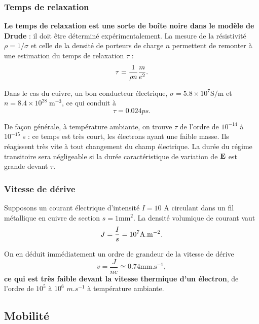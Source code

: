 \documentclass[11pt,a4paper]{report}
\begin{document}
\subsubsection{Temps de relaxation}
\textbf{Le temps de relaxation est une sorte de boîte noire dans le modèle de Drude} : il doit être déterminé expérimentalement. La mesure de la résistivité $\rho = 1/\sigma$ et celle de la densité de porteurs de charge $n$ permettent de remonter à une estimation du temps de relaxation $\tau$ : 
\begin{equation}
	\tau = \frac{1}{\rho n} \frac{m}{e^2}.\\
\end{equation}

Dans le cas du cuivre, un bon conducteur électrique, $\sigma = 5.8\times 10^7 \text{S}/\text{m}$ et $n = 8.4 \times 10^{28} \;\text{m}^{-3}$, ce qui conduit à
\begin{equation}
	\tau = 0.024 ps.
\end{equation}
	
De façon générale, à température ambiante, on trouve $\tau$ de l'ordre de $10^{-14}$ à $10^{-15}$ s : ce temps est très court, les électrons ayant une faible masse. Ils réagissent très vite à tout changement du champ électrique. La durée du régime transitoire sera négligeable si la durée caractéristique de variation de $\bold{E}$ est grande devant $\tau$.

\subsubsection{Vitesse de dérive}

Supposons un courant électrique d'intensité $I = 10$ A circulant dans un fil métallique en cuivre de section $s = 1 \text{mm}^2$. La densité volumique de courant vaut
\begin{equation}
	J = \frac{I}{s} = 10^7 \text{A}.\text{m}^{-2}.\\
\end{equation}

On en déduit immédiatement un ordre de grandeur de la vitesse de dérive
\begin{equation}
	v = \frac{J}{ne} \simeq 0.74 \text{mm}.\text{s}^{-1},
\end{equation}
\textbf{ce qui est très faible devant la vitesse thermique d'un électron}, de l'ordre de $10^5$ à $10^6$ $m.s^{-1}$ à température ambiante.

\subsection{Mobilité}
\end{document}

